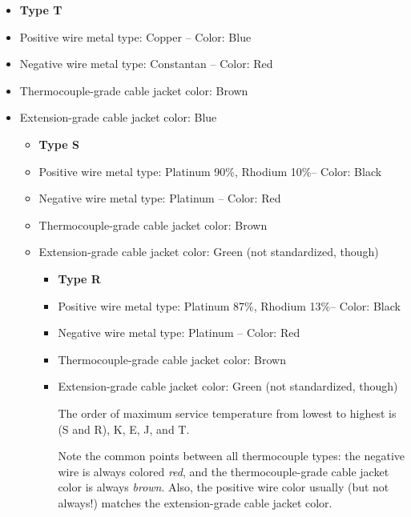 \begin{itemize}
\begin{itemize}
\begin{itemize}
\begin{itemize}
\begin{itemize}
\begin{itemize}
\begin{itemize}
\begin{itemize}
\begin{itemize}
\vskip 10pt

\begin{itemize}
\item{} {\bf Type T} 
\item{} Positive wire metal type: Copper -- Color: Blue 
\item{} Negative wire metal type: Constantan -- Color: Red 
\item{} Thermocouple-grade cable jacket color: Brown 
\item{} Extension-grade cable jacket color: Blue 
\medskip

\vskip 10pt

\begin{itemize}
\item{} {\bf Type S} 
\item{} Positive wire metal type: Platinum 90\%, Rhodium 10\%-- Color: Black 
\item{} Negative wire metal type: Platinum -- Color: Red 
\item{} Thermocouple-grade cable jacket color: Brown 
\item{} Extension-grade cable jacket color: Green (not standardized, though)
\medskip

\vskip 10pt

\begin{itemize}
\item{} {\bf Type R} 
\item{} Positive wire metal type: Platinum 87\%, Rhodium 13\%-- Color: Black 
\item{} Negative wire metal type: Platinum -- Color: Red 
\item{} Thermocouple-grade cable jacket color: Brown 
\item{} Extension-grade cable jacket color: Green (not standardized, though) 
\medskip

\vskip 10pt

The order of maximum service temperature from lowest to highest is (S and R), K, E, J, and T.

\vskip 10pt

Note the common points between all thermocouple types: the negative wire is always colored {\it red}, and the thermocouple-grade cable jacket color is always {\it brown}.  Also, the positive wire color usually (but not always!) matches the extension-grade cable jacket color.


\end{itemize}
\end{itemize}
\end{itemize}
\end{itemize}
\end{itemize}
\end{itemize}
\end{itemize}
\end{itemize}
\end{itemize}
\end{itemize}
\end{itemize}
\end{itemize}
